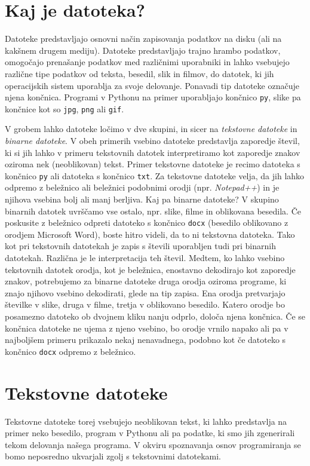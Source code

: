 \section{Kaj je datoteka?}

Datoteke predstavljajo osnovni način zapisovanja podatkov na disku (ali na kakšnem drugem mediju). Datoteke predstavljajo trajno hrambo podatkov, omogočajo prenašanje podatkov med različnimi uporabniki in lahko vsebujejo različne tipe podatkov od teksta, besedil, slik in filmov, do datotek, ki jih operacijskih sistem uporablja za svoje delovanje. Ponavadi tip datoteke označuje njena končnica. Programi v Pythonu na primer uporabljajo končnico \texttt{py}, slike pa končnice kot so \texttt{jpg}, \texttt{png} ali \texttt{gif}. 

V grobem lahko datoteke ločimo v dve skupini, in sicer na \emph{tekstovne datoteke} in \emph{binarne datoteke}. V obeh primerih vsebino datoteke predstavlja zaporedje števil, ki si jih lahko v primeru tekstovnih datotek interpretiramo kot zaporedje znakov oziroma nek (neoblikovan) tekst. Primer tekstovne datoteke je recimo datoteka s končnico \texttt{py} ali datoteka s končnico \texttt{txt}. Za tekstovne datoteke velja, da jih lahko odpremo z beležnico ali beležnici podobnimi orodji (npr. \emph{Notepad++}) in je njihova vsebina bolj ali manj berljiva. Kaj pa binarne datoteke? V skupino binarnih datotek uvrščamo vse ostalo, npr. slike, filme in oblikovana besedila. Če poskusite z beležnico odpreti datoteko s končnico \texttt{docx} (besedilo oblikovano z orodjem Microsoft Word), boste hitro videli, da to ni tekstovna datoteka. Tako kot pri tekstovnih datotekah je zapis s števili uporabljen tudi pri binarnih datotekah. Različna je le interpretacija teh števil. Medtem, ko lahko vsebino tekstovnih datotek orodja, kot je beležnica, enostavno dekodirajo kot zaporedje znakov, potrebujemo za binarne datoteke druga orodja oziroma programe, ki znajo njihovo vsebino dekodirati, glede na tip zapisa. Ena orodja pretvarjajo številke v slike, druga v filme, tretja v oblikovano besedilo. Katero orodje bo posamezno datoteko ob dvojnem kliku nanju odprlo, določa njena končnica. Če se končnica datoteke ne ujema z njeno vsebino, bo orodje vrnilo napako ali pa v najboljšem primeru prikazalo nekaj nenavadnega, podobno kot če datoteko s končnico \texttt{docx} odpremo z beležnico. 

\section{Tekstovne datoteke}
Tekstovne datoteke torej vsebujejo neoblikovan tekst, ki lahko predstavlja na primer neko besedilo, program v Pythonu ali pa podatke, ki smo jih zgenerirali tekom delovanja našega programa. V okviru spoznavanja osnov programiranja se bomo neposredno ukvarjali zgolj s tekstovnimi datotekami. 

